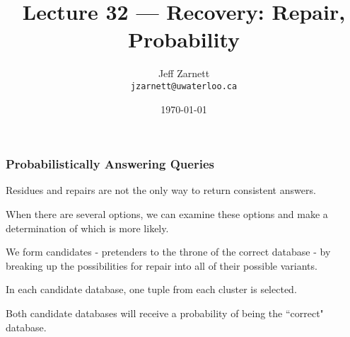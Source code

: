 

\title{Lecture 32 --- Recovery: Repair, Probability }

\author{Jeff Zarnett \\ \small \texttt{jzarnett@uwaterloo.ca}}
\date{\today}




\begin{frame}
  \titlepage

 \end{frame}

\begin{frame}
\frametitle{Probabilistically Answering Queries}

Residues and repairs are not the only way to return consistent answers. 

When there are several options, we can examine these options and make a determination of which is more likely. 

We form candidates - pretenders to the throne of the correct database -  by breaking up the possibilities for repair into all of their possible variants. 

In each candidate database, one tuple from each cluster is selected. 

Both candidate databases will receive a probability of being the ``correct" database.


\end{frame}


